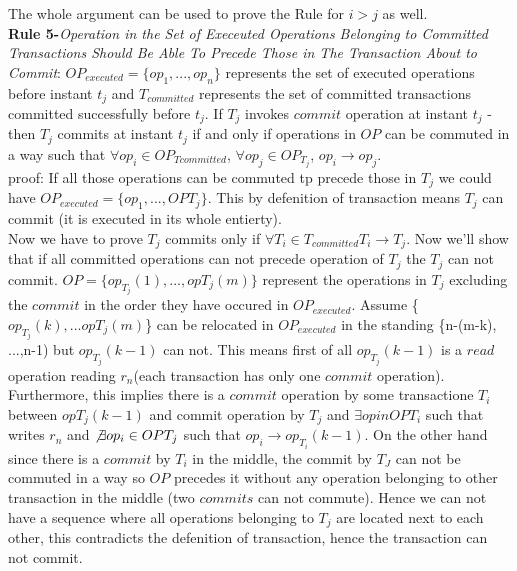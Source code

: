 \documentclass[a4paper, 11pt]{article}
\begin{document}
The whole argument can be used to prove the Rule for $i > j$ as well.\\

\textbf{Rule 5-}\emph{Operation in the Set of Execeuted Operations Belonging to Committed Transactions Should Be Able To Precede Those in The Transaction About to Commit}: $OP_{executed} = \{op_1,..., op_n\}$ represents the set of executed operations before instant $t_j$ and $T_{committed}$ represents the set of committed transactions committed successfully before $t_j$. If $T_j$ invokes ${commit}$ operation at instant $t_j$ - then $T_j$ commits at instant $t_j$ if and only if operations in $OP$ can be commuted in a way such that $\forall op_i \in OP_{T{committed}}$, $\forall op_j \in OP_{T_j}$, $op_i \rightarrow op_j$.\\


proof: If all those operations can be commuted tp precede those in $T_j$ we could have $OP_{executed} = \{op_1,...,OP{T_j}\}$. This by defenition of transaction means $T_j$ can commit (it is executed in its whole entierty).\\

Now we have to prove $T_j$ commits only if $\forall T_i \in T_{committed} T_i \rightarrow T_j$. Now we'll show that if all committed operations can not precede operation of $T_j$ the $T_j$ can not commit. $OP = \{op_{T_j}(1), ..., op{T_j}(m)\}$ represent the operations in $T_j$ excluding the ${commit}$ in the order they have occured in $OP_{executed}$. Assume \{$op_{T_j}(k),...op{T_j}(m)$\} can be relocated in $OP_{executed}$ in the standing \{n-(m-k), ...,n-1) but $op_{T_j}(k-1)$ can not. This means first of all $op_{T_j}(k-1)$ is a ${read}$ operation reading $r_n$(each transaction has only one ${commit}$ operation). Furthermore, this implies there is a ${commit}$ operation by some transactione $T_i$ between $op{T_j}(k-1)$ and commit operation by $T_j$ and $ \exists op in OP{T_i}$ such that writes $r_n$ and $\not \exists op_i \in OP{T_j}$ such that $op_i \rightarrow op_{T_i}(k-1)$. On the other hand since there is a ${commit}$ by $T_i$ in the middle, the commit by $T_J$ can not be commuted in a way so $OP$ precedes it without any operation belonging to other transaction in the middle (two ${commits}$ can not commute). Hence we can not have a sequence where all operations belonging to $T_j$ are located next to each other, this contradicts the defenition of transaction, hence the transaction can not commit.  


\end{document}
